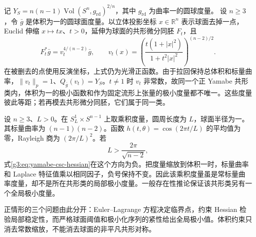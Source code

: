 \begin{example}\label{g3:exm:yamabe-sphere-nonuniqueness}
	记 \(Y_S=n(n-1)\operatorname{Vol}(S^n,g_{\mathrm{rd}})^{2/n}\)，其中 \(g_{\mathrm{rd}}\) 为曲率一的圆球度量。
	设 \(n\ge3\)，令 \(\bar g\) 是体积为一的圆球面度量。以立体投影坐标 \(x\in\mathbb R^n\) 表示球面去掉一点，Euclid 伸缩 \(x\mapsto tx\)、\(t>0\)，延伸为球面的共形微分同胚 \(F_t\)，且
	\[
		F_t^*\bar g=v_t^{4/(n-2)}\bar g,
		\qquad
		v_t(x)=\left(\frac{t(1+|x|^2)}{1+t^2|x|^2}\right)^{(n-2)/2}.
	\]
	在被删去的点使用反演坐标，上式仍为光滑正函数。由于拉回保持总体积和标量曲率，\(\|v_t\|_p=1\)、\(Q_{\bar g}(v_t)=Y_S\)。\(t\ne1\) 时 \(v_t\) 非常数，故同一个正 Yamabe 共形类内，体积为一的极小函数和作为固定流形上张量的极小度量都不唯一。这些度量彼此等距；若再模去共形微分同胚，它们属于同一类。
\end{example}

\begin{example}\label{g3:exm:yamabe-long-cylinder}
	设 \(n\ge3\)、\(L>0\)。在 \(S_L^1\times S^{n-1}\) 上取乘积度量，圆周长度为 \(L\)，球面半径为一。其标量曲率为 \((n-1)(n-2)\)。函数 \(h(t,\theta)=\cos(2\pi t/L)\) 的平均值为零，Rayleigh 商为 \((2\pi/L)^2\)。若
	\[
		L>\frac{2\pi}{\sqrt{n-2}},
	\]
	式\eqref{g3:eq:yamabe-csc-hessian}在这个方向为负。把度量缩放到体积一时，标量曲率和 Laplace 特征值乘以相同因子，负号保持不变。因此该乘积度量虽是常标量曲率度量，却不是所在共形类的局部极小度量。一般存在性推论保证该共形类另有一个全局极小度量。
\end{example}
正情形的三个问题由此分开：Euler--Lagrange 方程决定临界点，约束 Hessian 检验局部稳定性，而严格球面阈值和极小化序列的紧性给出全局极小值。体积约束只消去常数缩放，不能消去球面的非平凡共形对称。

